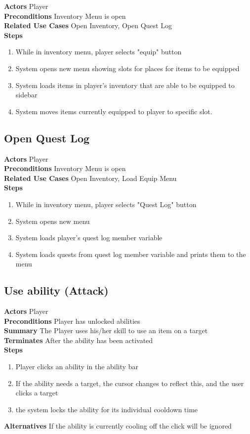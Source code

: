 \documentclass{report}
\begin{document}
\textbf{Actors}
Player \\
\textbf{Preconditions}
Inventory Menu is open \\
\textbf{Related Use Cases}
Open Inventory, Open Quest Log \\
\textbf{Steps}
\begin{enumerate}
\item While in inventory menu, player selects "equip" button
\item System opens new menu showing slots for places for items to be equipped
\item System loads items in player's inventory that are able to be equipped to sidebar
\item System moves items currently equipped to player to specific slot.
\end{enumerate}


\subsection{Open Quest Log}

\textbf{Actors}
Player \\
\textbf{Preconditions}
Inventory Menu is open \\
\textbf{Related Use Cases}
Open Inventory, Load Equip Menu \\
\textbf{Steps}
\begin{enumerate}
\item While in inventory menu, player selects "Quest Log" button
\item System opens new menu
\item System loads player's quest log member variable
\item System loads quests from quest log member variable and prints them to the menu
\end{enumerate}

\subsection{Use ability (Attack)}

\textbf{Actors} Player \\
\textbf{Preconditions} Player has unlocked abilities \\
\textbf{Summary} The Player uses his/her skill to use an item on a target \\
\textbf{Terminates} After the ability has been activated \\
\textbf{Steps}
\begin{enumerate}
	\item Player clicks an ability in the ability bar
	\item If the ability needs a target, the cursor changes to reflect this, and the user clicks a target
	\item the system locks the ability for its individual cooldown time
\end{enumerate}
\textbf{Alternatives}
If the ability is currently cooling off the click will be ignored \\
\end{document}
